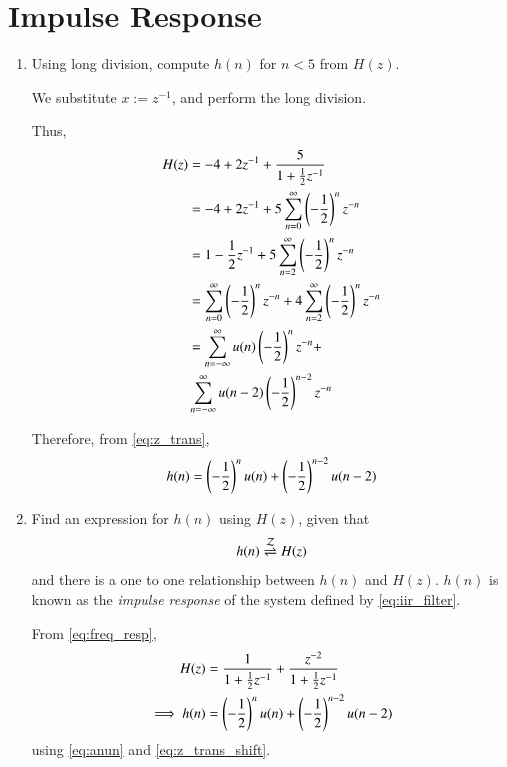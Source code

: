 \documentclass[journal,12pt,twocolumn]{IEEEtran}
\renewcommand\thesection{\arabic{section}}
\begin{document}
\section{Impulse Response}
\begin{enumerate}[label=\thesection.\arabic*]

\item Using long division, compute $h(n)$ for $n < 5$ from $H(z)$.

\solution We substitute $x := z^{-1}$, and perform the long division.


Thus,
\begin{align}
	H(z) &= -4 + 2z^{-1} + \frac{5}{1 + \frac{1}{2}z^{-1}} \\
		 &= -4 + 2z^{-1} + 5\sum_{n = 0}^{\infty}\left(-\frac{1}{2}\right)^nz^{-n} \\
		 &= 1 - \frac{1}{2}z^{-1} + 5\sum_{n = 2}^{\infty}\left(-\frac{1}{2}\right)^nz^{-n} \\
		 &= \sum_{n = 0}^{\infty}\left(-\frac{1}{2}\right)^nz^{-n} + 4\sum_{n = 2}^{\infty}\left(-\frac{1}{2}\right)^nz^{-n} \\
		 &= \sum_{n = -\infty}^{\infty}u(n)\left(-\frac{1}{2}\right)^nz^{-n} + \nonumber \\
		 &\sum_{n = -\infty}^{\infty}u(n - 2)\left(-\frac{1}{2}\right)^{n - 2}z^{-n}
\end{align}

Therefore, from \eqref{eq:z_trans}, 
\begin{align}
	h(n) = \left(-\frac{1}{2}\right)^{n}u(n) + \left(-\frac{1}{2}\right)^{n-2}u(n-2)
\end{align}

\item \label{prob:impulse_resp}
Find an expression for $h(n)$ using $H(z)$, given that 
\begin{equation}
\label{eq:impulse_resp}
h(n) \overset{\mathcal{Z}}{ \rightleftharpoons} H(z)
\end{equation}
and there is a one to one relationship between $h(n)$ and $H(z)$. $h(n)$ is known as the {\em impulse response} of the
system defined by \eqref{eq:iir_filter}.

\solution From \eqref{eq:freq_resp},
\begin{align}
H(z) &= \frac{1}{1 + \frac{1}{2}z^{-1}} + \frac{ z^{-2}}{1 + \frac{1}{2}z^{-1}} \\
\implies h(n) &= \left(-\frac{1}{2}\right)^{n}u(n) + \left(-\frac{1}{2}\right)^{n-2}u(n-2)
\end{align}
using \eqref{eq:anun} and \eqref{eq:z_trans_shift}.


\end{enumerate}
\end{document}
